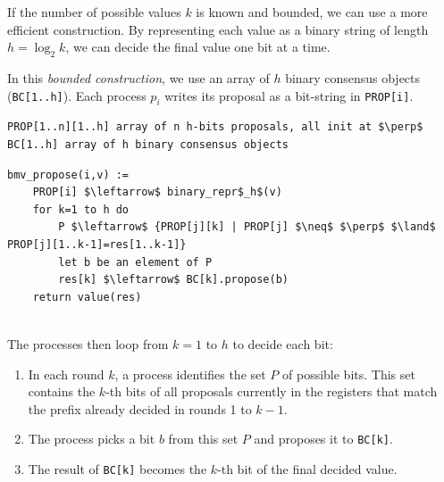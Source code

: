 If the number of possible values $k$ is known and bounded, we can use a more efficient construction. By representing each value as a binary string of length $h=\log_2k$, we can decide the final value one bit at a time.

In this \textit{bounded construction}, we use an array of $h$ binary consensus objects (\texttt{BC[1..h]}). Each process $p_i$ writes its proposal as a bit-string in \texttt{PROP[i]}. 

\begin{minipage}{\textwidth}
\begin{lstlisting}[mathescape]
PROP[1..n][1..h] array of n h-bits proposals, all init at $\perp$
BC[1..h] array of h binary consensus objects
\end{lstlisting}
\begin{lstlisting}[mathescape]
bmv_propose(i,v) :=
    PROP[i] $\leftarrow$ binary_repr$_h$(v)
    for k=1 to h do
        P $\leftarrow$ {PROP[j][k] | PROP[j] $\neq$ $\perp$ $\land$ PROP[j][1..k-1]=res[1..k-1]}
        let b be an element of P
        res[k] $\leftarrow$ BC[k].propose(b)
    return value(res)
\end{lstlisting}
\end{minipage}\\

The processes then loop from $k=1$ to $h$ to decide each bit:
\begin{enumerate}
    \item In each round $k$, a process identifies the set $P$ of possible bits. This set contains the $k$-th bits of all proposals currently in the registers that match the prefix already decided in rounds 1 to $k-1$.
    \item The process picks a bit $b$ from this set $P$ and proposes it to \texttt{BC[k]}.
    \item The result of \texttt{BC[k]} becomes the $k$-th bit of the final decided value.
\end{enumerate}

